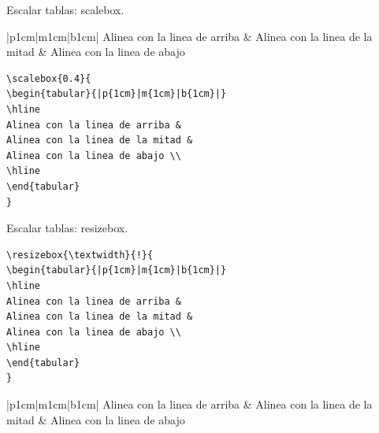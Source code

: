 \documentclass[dvipsnames,xcolor, handout]{beamer}
\theoremstyle{plain}
\theoremstyle{definition}
\begin{document}
\begin{frame}[fragile]{Escalar tablas: scalebox.}
\begin{center}
\footnotesize
\begin{tabular}{|p{1cm}|m{1cm}|b{1cm}|}
\hline
Alinea con la linea de arriba & 
Alinea con la linea de la mitad &
Alinea con la linea de abajo \\
\hline
\end{tabular}
\end{center}
\begin{minipage}{0.6\linewidth}
\footnotesize
\begin{verbatim}
\scalebox{0.4}{
\begin{tabular}{|p{1cm}|m{1cm}|b{1cm}|}
\hline
Alinea con la linea de arriba & 
Alinea con la linea de la mitad &
Alinea con la linea de abajo \\
\hline
\end{tabular}
}
\end{verbatim}
\end{minipage}\pause
\begin{minipage}{0.39\linewidth}
\footnotesize
\centering
{}
\end{minipage}
\end{frame}

\begin{frame}[fragile]{Escalar tablas: resizebox.}
\begin{minipage}{0.6\linewidth}
\footnotesize
\begin{verbatim}
\resizebox{\textwidth}{!}{
\begin{tabular}{|p{1cm}|m{1cm}|b{1cm}|}
\hline
Alinea con la linea de arriba & 
Alinea con la linea de la mitad &
Alinea con la linea de abajo \\
\hline
\end{tabular}
}
\end{verbatim}
\end{minipage}\pause

\begin{minipage}{0.49\linewidth}
\footnotesize
\centering
\begin{tabular}{|p{1cm}|m{1cm}|b{1cm}|}
\hline
Alinea con la linea de arriba & 
Alinea con la linea de la mitad &
Alinea con la linea de abajo \\
\hline
\end{tabular}
\end{minipage}
\begin{minipage}{0.49\linewidth}
\footnotesize
\centering
{}
\end{minipage}
\end{frame}
\end{document}
